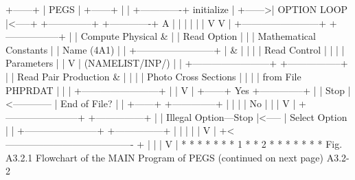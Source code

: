 \newpage
{}
\begin{center}
\begin{boxedverbatim}
                          +------+
                          | PEGS |
                          +------+
                            |  |       +-------------+
                initialize  |  +------>| OPTION LOOP |<-----+
             +--------------+          +-------------+      A
             |                                |             |
             |                                |             |
             V                                V             |
 +------------------------+          +-----------------+    |
 |   Compute Physical &   |          |   Read Option   |    |
 | Mathematical Constants |          |    Name (4A1)   |    |
 +------------------------+          |        &        |    |
             |                       |   Read Control  |    |
             |                       |    Parameters   |    |
             V                       | (NAMELIST/INP/) |    |
 +------------------------+          +-----------------+    |
 | Read Pair Production & |                   |             |
 |  Photo Cross Sections  |                   |             |
 |    from File PHPRDAT   |                   |             |
 +------------------------+                   |             |
                                              V             |
                +------+     Yes      +--------------+      |
                | Stop |<------------ | End of File? |      |
                +------+              +--------------+      |
                                              |             |
                                              | No          |
                                              |             |
                                              V             |
      +-----------------------+       +---------------+     |
      | Illegal Option---Stop |<----- | Select Option |     |
      +-----------------------+       +---------------+     |
                                              |             |
                                              |             |
                                              V             |
   +<---------------------------------------- +             |
   |                                                        |
   V                                                        |
   *                                                        *
  * *                                                      * *
 * 1 *                                                    * 2 *
  * *                                                      * *
   *                                                        *
      Fig. A3.2.1  Flowchart of the MAIN Program of PEGS
                        (continued on next page)
 A3.2-2
\end{boxedverbatim} 
\end{center}
